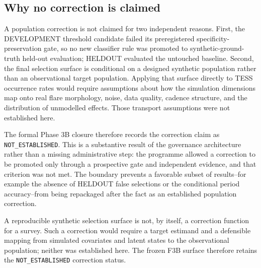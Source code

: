 \documentclass[11pt,a4paper]{article}
\renewcommand{\arraystretch}{1.08}
\begin{document}
\subsection{Why no correction is claimed}
A population correction is not claimed for two independent reasons. First, the DEVELOPMENT threshold candidate failed its preregistered specificity-preservation gate, so no new classifier rule was promoted to synthetic-ground-truth held-out evaluation; HELDOUT evaluated the untouched baseline. Second, the final selection surface is conditional on a designed synthetic population rather than an observational target population. Applying that surface directly to TESS occurrence rates would require assumptions about how the simulation dimensions map onto real flare morphology, noise, data quality, cadence structure, and the distribution of unmodelled effects. Those transport assumptions were not established here.

The formal Phase 3B closure therefore records the correction claim as \texttt{NOT\_ESTABLISHED}. This is a substantive result of the governance architecture rather than a missing administrative step: the programme allowed a correction to be promoted only through a prospective gate and independent evidence, and that criterion was not met. The boundary prevents a favorable subset of results--for example the absence of HELDOUT false selections or the conditional period accuracy--from being repackaged after the fact as an established population correction.

\clearpage
{}
\begin{landscape}
\begingroup
\setlength{\linewidth}{1.23\linewidth}
\setlength{\tabcolsep}{1.15pt}
\renewcommand{\arraystretch}{0.92}
\renewcommand{\small}{\fontsize{8.0}{8.35}\selectfont}
\let\moneoldunderscore\_
\renewcommand{\_}{\moneoldunderscore\allowbreak}
\renewcommand{\label}[1]{}

\endgroup
\end{landscape}
\restoregeometry
\clearpage

A reproducible synthetic selection surface is not, by itself, a correction function for a survey. Such a correction would require a target estimand and a defensible mapping from simulated covariates and latent states to the observational population; neither was established here. The frozen F3B surface therefore retains the \texttt{NOT\_ESTABLISHED} correction status.
\end{document}
